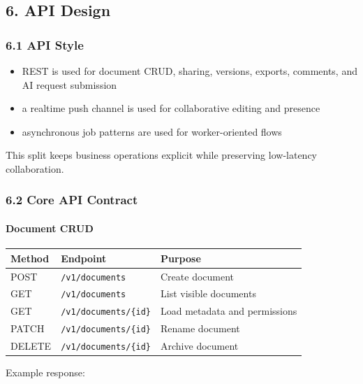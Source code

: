 \documentclass[a4paper]{article}
\providecommand{\tightlist}{%
  \setlength{\itemsep}{0pt}\setlength{\parskip}{0pt}}
\begin{document}
\subsection{6. API Design}\label{6-api-design}

\subsubsection{6.1 API Style}\label{61-api-style}

\begin{itemize}
\tightlist
\item
  REST is used for document CRUD, sharing, versions, exports, comments,
  and AI request submission
\item
  a realtime push channel is used for collaborative editing and presence
\item
  asynchronous job patterns are used for worker-oriented flows
\end{itemize}

This split keeps business operations explicit while preserving
low-latency collaboration.

\subsubsection{6.2 Core API Contract}\label{62-core-api-contract}

\paragraph{Document CRUD}\label{document-crud}

\begin{table}[h]
\small
\begin{tabularx}{\textwidth}{@{}L{14mm}L{44mm}Y@{}}
\toprule
Method & Endpoint & Purpose \\
\midrule
POST & \texttt{/v1/documents} & Create document \\
GET & \texttt{/v1/documents} & List visible documents \\
GET & \texttt{/v1/documents/\{id\}} & Load metadata and permissions \\
PATCH & \texttt{/v1/documents/\{id\}} & Rename document \\
DELETE & \texttt{/v1/documents/\{id\}} & Archive document \\
\bottomrule
\end{tabularx}
\end{table}

Example response:
\end{document}

